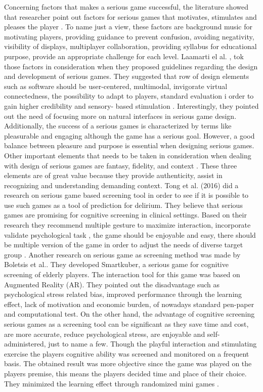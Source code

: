 Concerning factors that makes a serious game successful, the literature showed that researcher point out factors for serious games that motivates, stimulates and pleases the player \cite{Laamarti2014}. To name just a view, these factors are background music for motivating players, providing guidance to prevent confusion, avoiding negativity, visibility of displays, multiplayer collaboration, providing syllabus for educational purpose, provide an appropriate challenge for each level.
Laamarti el al. \cite{Laamarti2014}, tok those factors in consideration when they proposed guidelines regarding the design and development of serious games. They suggested that row of design elements such as software should be user-centered, multimodal, invigorate virtual connectedness, the possibility to adapt to players, standard evaluation i order to gain higher credibility and sensory- based stimulation \cite{Laamarti2014}.
Interestingly, they pointed out the need of focusing more on natural interfaces in serious game design. Additionally, the success of a  serious games is characterized by terms like  pleasurable and engaging although the game has a serious goal. However, a good balance between pleasure and purpose is essential when designing serious games.
Other important elements that needs to be taken in consideration when dealing with design of serious games are fantasy, fidelity, and context
\cite{Charsky2010}. These three elements are of great value because they provide authenticity, assist in recognizing and understanding demanding context.
Tong et al. (2016) did a research on serious game based screening tool in order to see if it is possible to use such games as a tool of prediction for delirium. They believe that serious games are promising for cognitive screening in clinical settings.  Based on their research they recommend multiple gesture to maximize interaction, incorporate validate psychological task , the game should be enjoyable and easy, there should be multiple version of the game in order to adjust the needs of diverse target group \cite{Tong2016}. 
Another research on serious game as screening method was made by Boletsis et al.\cite{Boletsis2016}. They developed Smartkuber, a serious game for cognitive screening of elderly players. The interaction tool for this game was based on Augmented Reality (AR). They pointed out the disadvantage such as psychological stress related bias, improved performance through the learning effect, lack of motivation and economic burden, of nowadays standard pen-paper and computational test. On the other hand, the advantage of cognitive screening serious games as a screening tool can be significant as they save time and cost, are more accurate, reduce psychological stress, are enjoyable and self-administered, just to name a few.  Though the playful interaction and stimulating exercise the players cognitive ability was screened and monitored on a frequent basis. The obtained result was more objective since the game was played on the players premise, this means the players decided time and place of their choice. They minimized the learning effect through randomized mini games \cite{Boletsis2016}. 
 


